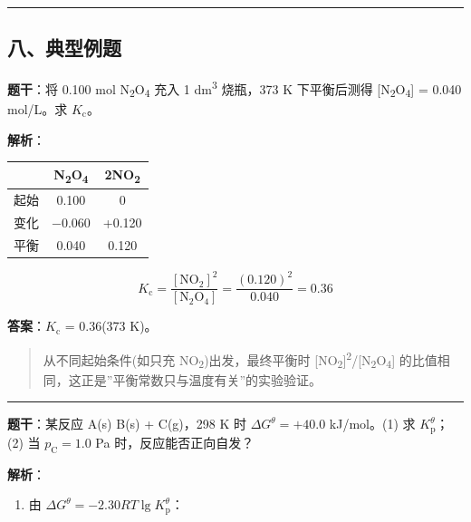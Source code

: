 \begin{center}\rule{0.5\linewidth}{0.5pt}\end{center}

\subsection{八、典型例题}\label{ux516bux5178ux578bux4f8bux9898}

\textbf{题干}：将 0.100 mol N\textsubscript{2}O\textsubscript{4} 充入 1 dm\textsuperscript{3} 烧瓶，373 K 下平衡后测得 {[}N\textsubscript{2}O\textsubscript{4}{]} = 0.040 mol/L。求 \(K_{\mathrm c}\)。

\textbf{解析}：

{\def\LTcaptype{none} %
\begin{longtable}[]{@{}lcc@{}}
\toprule\noalign{}
& N\textsubscript{2}O\textsubscript{4} & 2NO\textsubscript{2} \\
\midrule\noalign{}
\endhead
\bottomrule\noalign{}
\endlastfoot
起始 & 0.100 & 0 \\
变化 & −0.060 & +0.120 \\
平衡 & 0.040 & 0.120 \\
\end{longtable}
}

\[K_{\mathrm c} = \frac{[\mathrm{NO_2}]^2}{[\mathrm{N_2O_4}]} = \frac{(0.120)^2}{0.040} = 0.36\]

\textbf{答案}：\(K_{\mathrm c}\) = 0.36(373 K)。

\begin{quote}
从不同起始条件(如只充 NO\textsubscript{2})出发，最终平衡时 {[}NO\textsubscript{2}{]}\textsuperscript{2}/{[}N\textsubscript{2}O\textsubscript{4}{]} 的比值相同，这正是''平衡常数只与温度有关''的实验验证。
\end{quote}

\begin{center}\rule{0.5\linewidth}{0.5pt}\end{center}

\textbf{题干}：某反应 A(s) \衡 B(s) + C(g)，298 K 时 \(\Delta G^\theta = +40.0\) kJ/mol。(1) 求 \(K_{\mathrm p}^\theta\)；(2) 当 \(p_{\mathrm C} = 1.0\) Pa 时，反应能否正向自发？

\textbf{解析}：

\begin{enumerate}
\def\labelenumi{(\arabic{enumi})}
\tightlist
\item
  由 \(\Delta G^\theta = -2.30RT \lg K_{\mathrm p}^\theta\)：
\end{enumerate}

